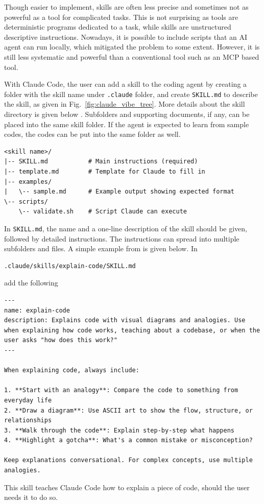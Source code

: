 Though easier to implement, skills are often less precise and sometimes not as powerful as a tool for complicated tasks. This is not surprising as tools are deterministic programs dedicated to a task, while skills are unstructured descriptive instructions. Nowadays, it is possible to include scripts that an AI agent can run locally, which mitigated the problem to some extent. However, it is still less systematic and powerful than a conventional tool such as an MCP based tool.

With Claude Code, the user can add a skill to the coding agent by creating a folder with the skill name under \verb|.claude| folder, and create \verb|SKILL.md| to describe the skill, as given in Fig.~\ref{fig:claude_vibe_tree}. More details about the skill directory is given below \cite{claudeCode2026skills}. Subfolders and supporting documents, if any, can be placed into the same skill folder. If the agent is expected to learn from sample codes, the codes can be put into the same folder as well.
\begin{lstlisting}
<skill name>/
|-- SKILL.md           # Main instructions (required)
|-- template.md        # Template for Claude to fill in
|-- examples/
|   \-- sample.md      # Example output showing expected format
\-- scripts/
    \-- validate.sh    # Script Claude can execute
\end{lstlisting}

In \verb|SKILL.md|, the name and a one-line description of the skill should be given, followed by detailed instructions. The instructions can spread into multiple subfolders and files. A simple example from \cite{claudeCode2026skills} is given below. In
\begin{lstlisting}
.claude/skills/explain-code/SKILL.md
\end{lstlisting}
add the following
\begin{lstlisting}
---
name: explain-code
description: Explains code with visual diagrams and analogies. Use when explaining how code works, teaching about a codebase, or when the user asks "how does this work?"
---

When explaining code, always include:

1. **Start with an analogy**: Compare the code to something from everyday life
2. **Draw a diagram**: Use ASCII art to show the flow, structure, or relationships
3. **Walk through the code**: Explain step-by-step what happens
4. **Highlight a gotcha**: What's a common mistake or misconception?

Keep explanations conversational. For complex concepts, use multiple analogies.
\end{lstlisting}
This skill teaches Claude Code how to explain a piece of code, should the user needs it to do so.

